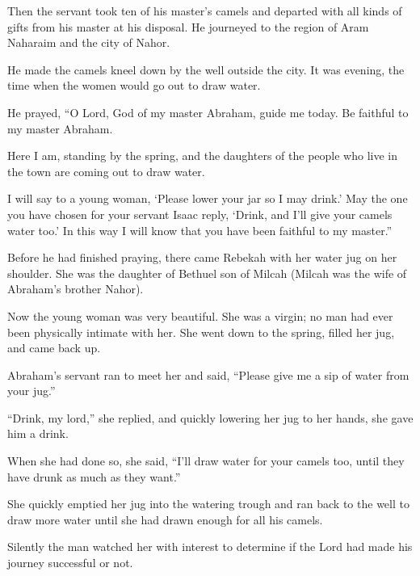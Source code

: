 \begin{scripture}
 Then the servant took ten of his master's camels and departed with all kinds of gifts from his master at his disposal. He journeyed to the region of Aram Naharaim and the city of Nahor.
 He made the camels kneel down by the well outside the city. It was evening, the time when the women would go out to draw water.
 He prayed, ``O Lord, God of my master Abraham, guide me today. Be faithful to my master Abraham.
 Here I am, standing by the spring, and the daughters of the people who live in the town are coming out to draw water.
 I will say to a young woman, `Please lower your jar so I may drink.' May the one you have chosen for your servant Isaac reply, `Drink, and I'll give your camels water too.' In this way I will know that you have been faithful to my master.''
\everypar{}

 Before he had finished praying, there came Rebekah with her water jug on her shoulder. She was the daughter of Bethuel son of Milcah (Milcah was the wife of Abraham's brother Nahor).
 Now the young woman was very beautiful. She was a virgin; no man had ever been physically intimate with her. She went down to the spring, filled her jug, and came back up.
 Abraham's servant ran to meet her and said, ``Please give me a sip of water from your jug.''
 ``Drink, my lord,'' she replied, and quickly lowering her jug to her hands, she gave him a drink.
 When she had done so, she said, ``I'll draw water for your camels too, until they have drunk as much as they want.''
 She quickly emptied her jug into the watering trough and ran back to the well to draw more water until she had drawn enough for all his camels.
 Silently the man watched her with interest to determine if the Lord had made his journey successful or not.
\everypar{}


\end{scripture}
